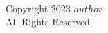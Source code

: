

\chapter*{}
\hspace{1em}\vspace{18em} \\ %
\begin{center}
    Copyright {\textcopyright} 2023 {$author$} \\
    All Rights Reserved     
\end{center}


